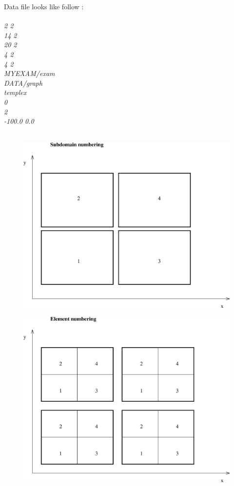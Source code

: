 \documentclass[12pt]{book}
\begin{document}
Data file looks like follow :\\
\\
{\it
2 2\\
14 2\\
20 2\\
4  2\\
4  2\\
MYEXAM/exam\\
DATA/graph\\
templex\\
0\\
2\\
-100.0 0.0\\
\\
}
\begin{figure}[h]
\includegraphics[width=120mm]{pgquaddn.eps}
\end{figure}
\begin{figure}
\includegraphics[width=120mm]{pgquaden.eps}
\end{figure}
\end{document}
